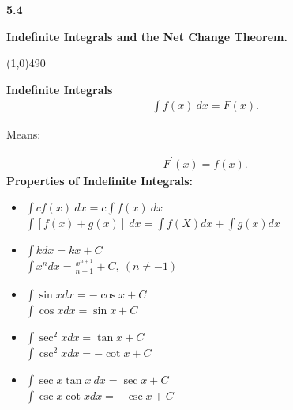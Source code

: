 \documentclass{report}
\begin{document}


\pagebreak \bigbreak \noindent
\begin{Large}
  \begin{mdframed}
    \begin{center}
      \textbf{5.4}
    \end{center}
  \end{mdframed}
\end{Large}
\begin{Large}
  \begin{center}
    \textbf{Indefinite Integrals and the Net Change Theorem.}
  \end{center}
\end{Large}
\line(1,0){490}

\bigbreak \noindent
\begin{mdframed}
  \textbf{Indefinite Integrals}
  \begin{align*}
    \int f(x)\ dx = F(x)
  .\end{align*}
  \begin{center}
    Means:
  \end{center}
  \begin{align*}
    F^{\prime}(x) = f(x) 
  .\end{align*}
  \smallbreak \noindent
  \smallbreak \noindent
  \bigbreak \noindent 
  \textbf{Properties of Indefinite Integrals:}
  \begin{itemize}
    \item $\int cf(x)\ dx = c \int f(x)\ dx$ \ \ \ \ \ \ \ \ \ \ \ \ \  \ \ \ \ \ \ \ \ \ \ \ \ \ \ \ \ \ \ \ \ \ \ \ \textbullet \ \ $\int [f(x) + g(x)]\ dx = \int f(X)dx + \int g(x)dx$
    \item $\int kdx = kx + C$  \ \ \ \ \ \ \ \ \ \ \ \  \ \ \ \ \ \ \ \ \ \ \ \ \ \ \ \ \ \  \ \ \ \ \ \ \ \ \ \ \ \ \ \ \ \ \ \textbullet \ \  $\int x^{n} dx = \frac{x^{n+1}}{n+1} + C,\ (n \neq -1) $
    \item $\int \sin{x} dx = -\cos{x} + C $  \ \ \ \ \ \ \ \ \ \ \ \ \  \ \ \ \ \ \ \ \ \ \ \ \ \ \ \ \ \ \ \ \ \ \ \ \  \textbullet \ \ $\int \cos{x} dx = \sin{x} + C  $
    \item $\int \sec^{2}{x} dx  = \tan{x} + C$ \ \ \ \ \ \ \ \ \ \ \ \ \ \ \ \ \ \ \ \ \ \ \ \ \ \ \ \ \ \ \ \ \ \ \ \ \ \ \textbullet \ \  $\int \csc^{2}{x} dx = - \cot{x} + C  $
    \item $\int \sec{x}\tan{x}\ dx = \sec{x} + C  $ \ \ \ \ \ \ \ \ \ \ \  \ \ \ \  \ \ \ \ \ \ \ \ \ \ \ \ \ \ \ \ \  \textbullet \ \ $\int \csc{x}\cot{x}dx  = -\csc{x} + C $
  \end{itemize}
\end{mdframed}
\end{document}
